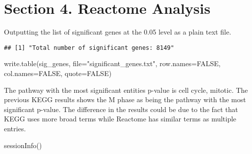 \documentclass[
]{article}
\newenvironment{Shaded}{\begin{snugshade}}{\end{snugshade}}
\newcommand{\AttributeTok}[1]{\textcolor[rgb]{0.77,0.63,0.00}{#1}}
\newcommand{\ConstantTok}[1]{\textcolor[rgb]{0.00,0.00,0.00}{#1}}
\newcommand{\FloatTok}[1]{\textcolor[rgb]{0.00,0.00,0.81}{#1}}
\newcommand{\FunctionTok}[1]{\textcolor[rgb]{0.00,0.00,0.00}{#1}}
\newcommand{\NormalTok}[1]{#1}
\newcommand{\OtherTok}[1]{\textcolor[rgb]{0.56,0.35,0.01}{#1}}
\newcommand{\SpecialCharTok}[1]{\textcolor[rgb]{0.00,0.00,0.00}{#1}}
\newcommand{\StringTok}[1]{\textcolor[rgb]{0.31,0.60,0.02}{#1}}
\begin{document}
\hypertarget{section-4.-reactome-analysis}{%
\section{Section 4. Reactome
Analysis}\label{section-4.-reactome-analysis}}

Outputting the list of significant genes at the 0.05 level as a plain
text file.

\begin{Shaded}
\end{Shaded}

\begin{verbatim}
## [1] "Total number of significant genes: 8149"
\end{verbatim}

\begin{Shaded}
\begin{Highlighting}[]
\FunctionTok{write.table}\NormalTok{(sig\_genes, }\AttributeTok{file=}\StringTok{"significant\_genes.txt"}\NormalTok{, }\AttributeTok{row.names=}\ConstantTok{FALSE}\NormalTok{, }\AttributeTok{col.names=}\ConstantTok{FALSE}\NormalTok{, }\AttributeTok{quote=}\ConstantTok{FALSE}\NormalTok{)}
\end{Highlighting}
\end{Shaded}

The pathway with the most significant entities p-value is cell cycle,
mitotic. The previous KEGG results shows the M phase as being the
pathway with the most significant p-value. The difference in the results
could be due to the fact that KEGG uses more broad terms while Reactome
has similar terms as multiple entries.

\begin{Shaded}
\begin{Highlighting}[]
\FunctionTok{sessionInfo}\NormalTok{()}
\end{Highlighting}
\end{Shaded}
\end{document}
